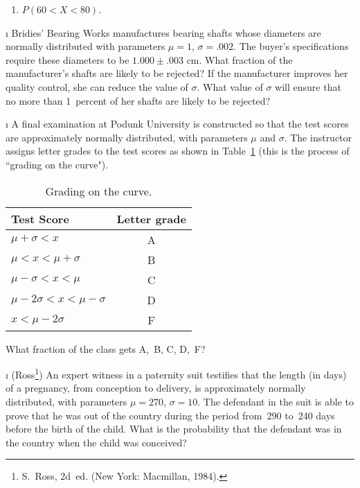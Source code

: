 \begin{LJSItem}
\begin{enumerate}
\item $P(60 < X < 80)$.
\end{enumerate}

\i\label{5.2.25} Bridies' Bearing Works manufactures bearing shafts whose
diameters are normally distributed with parameters $\mu = 1$, $\sigma = .002$.  The
buyer's specifications require these diameters to be $1.000 \pm .003$ cm.  What
fraction of the manufacturer's shafts are likely to be rejected?  If the manufacturer
improves her quality control, she can reduce the value of
$\sigma$.  What value of $\sigma$ will ensure that no more than 1~percent of her
shafts are likely to be rejected?

\i\label{exer 5.2.26} A final examination at Podunk University is constructed so
that the test scores are approximately normally distributed, with parameters $\mu$ and
$\sigma$.  The instructor assigns letter grades to the test scores as shown 
in Table~\ref{table 5.9} (this is the process of ``grading on the curve").
\begin{table}
\centering
\begin{tabular}{lc} Test Score     & Letter grade           \\
\hline
$\mu + \sigma < x$                 & A                      \\
$\mu < x < \mu + \sigma$           & B                      \\
$\mu - \sigma < x < \mu $          & C                      \\
$\mu - 2\sigma < x < \mu - \sigma$ & D                      \\
$x < \mu - 2\sigma$                & F                      \\
\end{tabular}
\caption{Grading on the curve.}
\label{table 5.9}
\end{table}

\noindent What fraction of the class gets A,~B, C, D,~F?

\i\label{exer 5.2.27} (Ross\footnote{S.~Ross,  2d~ed. (New York: Macmillan, 1984).}) An expert witness in a paternity suit testifies that the length (in days) of a pregnancy, from conception to delivery, is
approximately normally distributed, with parameters $\mu = 270$,
$\sigma = 10$.  The defendant in the suit is able to prove that he was out of the
country during the period from~290 to~240 days before the birth of the child.  What is
the probability that the defendant was in the country when the child was conceived?


\end{LJSItem}
